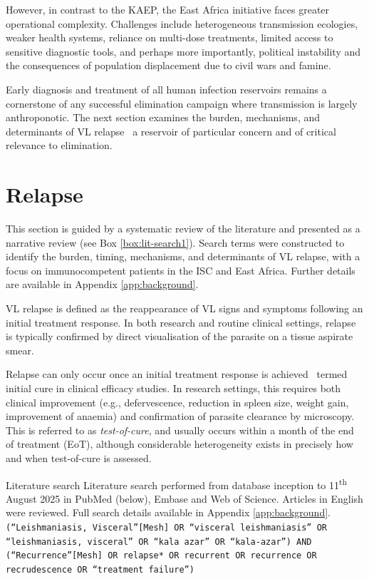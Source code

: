 However, in contrast to the KAEP, the East Africa initiative faces greater operational complexity. Challenges include heterogeneous transmission ecologies, weaker health systems, reliance on multi-dose treatments, limited access to sensitive diagnostic tools, and perhaps more importantly, political instability and the consequences of population displacement due to civil wars and famine\cite{WHO_2024_VL_easternAfrica}.

Early diagnosis and treatment of all human infection reservoirs remains a cornerstone of any successful elimination campaign where transmission is largely anthroponotic. The next section examines the burden, mechanisms, and determinants of VL relapse \textemdash\  a reservoir of particular concern and of critical relevance to elimination.

\section{\label{sec:relapse}Relapse}

This section is guided by a systematic review of the literature and presented as a narrative review (see Box \ref{box:lit-search1}). Search terms were constructed to identify the burden, timing, mechanisms, and determinants of VL relapse, with a focus on immunocompetent patients in the ISC and East Africa. Further details are available in Appendix \ref{app:background}.

VL relapse is defined as the reappearance of VL signs and symptoms following an initial treatment response\cite{WHO2010kalaazarIndicators, WHO2024_Leishmaniasis}. In both research and routine clinical settings, relapse is typically confirmed by direct visualisation of the parasite on a tissue aspirate smear\cite{chhajed2024}.

Relapse can only occur once an initial treatment response is achieved \textemdash\  termed initial cure in clinical efficacy studies. In research settings, this requires both clinical improvement (e.g., defervescence, reduction in spleen size, weight gain, improvement of anaemia) and confirmation of parasite clearance by microscopy. This is referred to as \textit{test-of-cure}, and usually occurs within a month of the end of treatment (EoT), although considerable heterogeneity exists in precisely how and when test-of-cure is assessed\cite{dahal2024}.

\begin{mybox}[label=box:lit-search1]{Literature search}
  Literature search performed from database inception to 11\textsuperscript{th} August 2025 in PubMed (below), Embase and Web of Science. Articles in English were reviewed. Full search details available in Appendix \ref{app:background}.
  \tcbline
  \texttt{(``Leishmaniasis, Visceral''[Mesh] OR ``visceral leishmaniasis'' OR ``leishmaniasis, visceral'' OR ``kala azar'' OR ``kala-azar'') AND (``Recurrence''[Mesh] OR relapse* OR recurrent OR recurrence OR recrudescence OR ``treatment failure'')}
\end{mybox}

